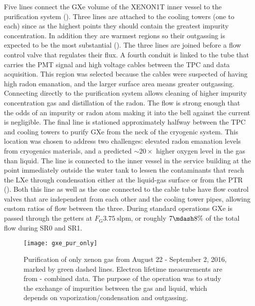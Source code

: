 Five lines connect the GXe volume of the XENON1T inner vessel to the purification system ().  Three lines are
attached to the cooling towers (one to each) since as the highest points they should contain the greatest impurity concentration.  In
addition they are warmest regions so their outgassing is expected to be the most
substantial ().  The three lines are joined before a flow control valve
that regulates their flux.  A fourth conduit is linked to the tube that carries the PMT signal and high voltage cables between the TPC and
data acquisition.  This region was selected because the cables were suspected of having high radon emanation, and the larger surface area
means greater outgassing.  Connecting directly to the purification system allows cleaning of higher impurity concentration gas and
distillation of the radon.  The flow is strong enough that the odds of an impurity or radon atom making it into the bell against the
current is negligible.  The final line is stationed
approximately halfway between the TPC and cooling towers to purify GXe from the neck of the cryogenic system.  This location was
chosen to address two challenges: elevated radon emanation levels from cryogenics materials, and a predicted ${\sim}20\times$ higher
oxygen level in the gas than liquid.  The line is connected to the inner vessel in the service building at the point immediately outside
the water tank to lessen the contaminants that reach the LXe through condensation either at the liquid-gas surface or from the PTR
().  Both this line as well
as the one connected to the cable tube have flow control valves that are independent from each other and the cooling tower pipes, allowing
custom ratios of flow between the three.  During standard operations GXe is passed through the getters at
$F_{\mathrm{G}} 3.75\ \mathrm{slpm}$, or roughly $7 \mdash 8\%$ of the total flow during SR0 and SR1.

\begin{figure}
\centering
\texttt{[image: gxe\_pur\_only]}
\caption[Purification of only xenon gas from August 22 - September 2, 2016, marked by green dashed lines.  The purpose of the operation was
to study the exchange of impurities between the gas and liquid.]{Purification of only xenon gas from August 22 - September 2, 2016, marked by
green dashed lines.  Electron lifetime measurements
are from - combined data.  The purpose of the operation was to study the exchange of impurities between the
gas and liquid, which depends on vaporization/condensation and outgassing.}
\label{fig:electron_lifetime_model_gxe_xenon1t}
\end{figure}

